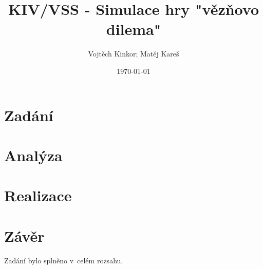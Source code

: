\documentclass[pdftex,a4paper]{article}
\title{KIV/VSS - Simulace hry "vězňovo dilema"}
\author{Vojtěch Kinkor; Matěj Kareš}
\date{\today}
\begin{document}


\newpage

\tableofcontents
\newpage



\section{Zadání}


\newpage
\section{Analýza}


\newpage
\section{Realizace}


\newpage
\section{Závěr}

Zadání bylo splněno v~celém rozsahu.
\end{document}

